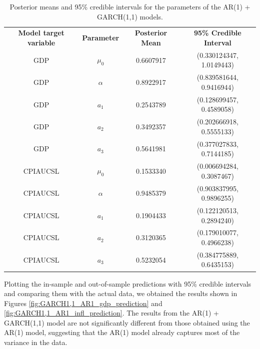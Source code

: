 \begin{table}[H]
    \centering
    \begin{tabular}{c|c|c|c}
        \textbf{Model target variable } & \textbf{Parameter } & \textbf{Posterior Mean } & \textbf{95\% Credible Interval } \\
        \cline{1-4}
        GDP      & $\mu_0$  & 0.6607917 & (0.330124347, 1.0149443) \\
        GDP      & $\alpha$ & 0.8922917 & (0.839581644, 0.9416944) \\
        GDP      & $a_1$    & 0.2543789 & (0.128699457, 0.4589058) \\
        GDP      & $a_2$    & 0.3492357 & (0.202666918, 0.5555133) \\
        GDP      & $a_3$    & 0.5641981 & (0.377027833, 0.7144185) \\
        CPIAUCSL & $\mu_0$  & 0.1533340 & (0.006694284, 0.3087467) \\
        CPIAUCSL & $\alpha$ & 0.9485379 & (0.903837995, 0.9896255) \\
        CPIAUCSL & $a_1$    & 0.1904433 & (0.122120513, 0.2894240) \\
        CPIAUCSL & $a_2$    & 0.3120365 & (0.179010077, 0.4966238) \\
        CPIAUCSL & $a_3$    & 0.5232054 & (0.384775889, 0.6435153) \\
    \end{tabular}
    \caption{Posterior means and 95\% credible intervals for the parameters of the AR(1) + GARCH(1,1) models.}
    \label{tab:GARCH1,1_AR1_posteriors}
\end{table}
Plotting the in-sample and out-of-sample predictions with 95\% credible intervals and comparing them with the actual data, we obtained the results shown in Figures \ref{fig:GARCH1,1_AR1_gdp_prediction} and \ref{fig:GARCH1,1_AR1_infl_prediction}. The results from the AR(1) + GARCH(1,1) model are not significantly different from those obtained using the AR(1) model, suggesting that the AR(1) model already captures most of the variance in the data. \\

